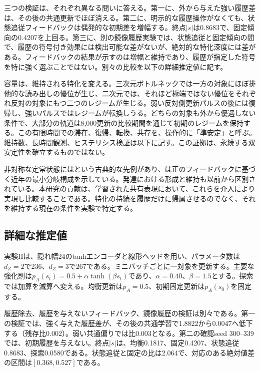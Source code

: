 三つの検証は、それぞれ異なる問いに答える。第一に、外から与えた強い履歴差は、その後の共通更新でほぼ消える。第二に、明示的な履歴操作がなくても、状態追従フィードバックは偶発的な初期差を増幅する。終点$|s|$は0.8683で、固定傾向の0.4207を上回る。第三に、別の鏡像履歴実験では、状態追従と固定傾向の間で、履歴の符号付き効果には検出可能な差がないが、絶対的な特化深度には差がある。フィードバックの結果が示すのは増幅と維持であり、履歴が指定した符号を特に強く選ぶことではない。別々の比較を以下の詳細推定値に記す。

容量は、維持される特化を変える。三次元ボトルネックでは一方の対象にほぼ排他的な読み出しの優位が生じ、二次元では、それほど極端ではない優位をそれぞれ反対の対象にもつ二つのレジームが生じる。弱い反対側更新パルスの後には復帰し、強いパルスではレジームが転換しうる。どちらの対象も外から優遇しない条件で、大部分の軌道は8,000更新の比較期間を通じて初期のレジームを保持する。この有限時間での滞在、復帰、転換、共存を、操作的に「準安定」と呼ぶ。維持数、長時間観測、ヒステリシス検証は以下に記す。この証拠は、永続する双安定性を確立するものではない。

非対称な定常状態には\citet{harris1997ocular}という古典的な先例があり、\citet{kiselev2026bifurcation}は正のフィードバックに基づく近年の最小分岐構成を示している。発達における形成と維持も以前から区別されている\citep{crair1998visual}。本研究の貢献は、学習された共有表現において、これらを介入により実現し比較することである。特化の持続を履歴だけに帰属させるのでなく、それを維持する現在の条件を実験で特定する。


\subsection{詳細な推定値}
実験IIは、隠れ幅24のtanhエンコーダと線形ヘッドを用い、パラメータ数は$d_Z=2$で236、$d_Z=3$で267である。ミニバッチごとに一対象を更新する。主要な強化則は$p_A(s_t)=0.5+\alpha\tanh(\beta s_t)$であり、$\alpha=0.40$、$\beta=1.5$とする。探索では加算を減算へ変える。均衡更新は$p_A=0.5$、初期固定更新は$p_A(s_0)$を固定する。

履歴除去、履歴を与えないフィードバック、鏡像履歴の検証は別々である。第一の検証では、強く与えた履歴差が、その後の共通学習で1.8822から0.0047へ低下する（残存比0.002）。弱い共通偏りでは比0.003となる。第二の確認seed 300--339では、初期履歴を与えない。終点$|s|$は、均衡0.1817、固定0.4207、状態追従0.8683、探索0.0580である。状態追従と固定の比は2.064で、対応のある絶対値差の区間は$[0.368,0.527]$である。

